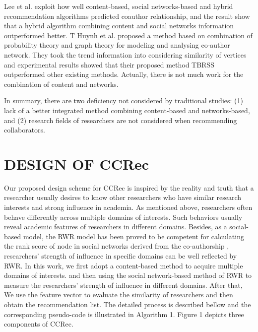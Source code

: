 \documentclass[review]{elsarticle}
\begin{document}
Lee et al. \cite{lee2011recommending} exploit how well content-based, social networks-based and hybrid recommendation algorithms predicted coauthor relationship, and the result show that a hybrid algorithm combining content and social networks information outperformed better. T Huynh et al. \cite{huynh2013trend} proposed a method based on combination of probability theory and graph theory for modeling and analysing co-author network. They took the trend information into considering similarity of vertices and experimental results showed that their proposed method TBRSS outperformed other existing methods. Actually, there is not much work for the combination of content and networks.

In summary, there are two deficiency not considered by traditional studies: (1) lack of a better integrated method combining content-based and networks-based, and (2) research fields of researchers are not considered when recommending collaborators.
\section{DESIGN OF CCRec}
Our proposed design scheme for CCRec is inspired by the reality and truth that a researcher usually desires to know other researchers who have similar research interests and strong influence in academia. As mentioned above, researchers often behave differently across multiple domains of interests. Such behaviors usually reveal academic features of researchers in different domains. Besides, as a social-based model, the RWR model has been proved to be competent for calculating the rank score of node in social networks derived from the co-authorship \cite{li2014acrec}, researchers' strength of influence in specific domains can be well reflected by RWR. In this work, we first adopt a content-based method to acquire multiple domains of interests. and then using the social network-based method of RWR to measure the researchers' strength of influence in different domains. After that, We use the feature vector to evaluate the similarity of researchers and then obtain the recommendation list. The detailed process is described bellow and the corresponding pseudo-code is illustrated in Algorithm 1. Figure 1 depicts three components of CCRec.

\end{document}

